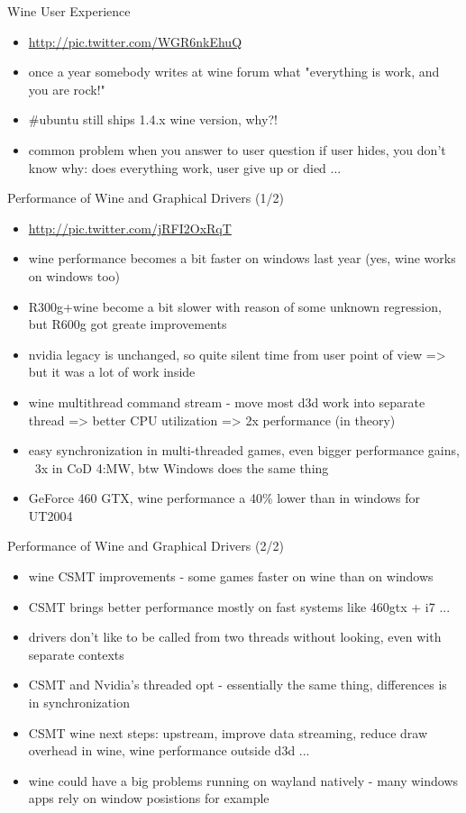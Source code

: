 \documentclass[aspectratio=169]{beamer}
\begin{document}
\begin{frame}{Wine User Experience}
  \begin{itemize}
  \item \url{http://pic.twitter.com/WGR6nkEhuQ}
  \item once a year somebody writes at wine forum what "everything is work, and you are rock!"
  \item \#ubuntu still ships 1.4.x wine version, why?!
  \item common problem when you answer to user question if user hides, you don't know why: does everything work, user give up or died ...
  \end{itemize}
\end{frame} 
 
\begin{frame}{Performance of Wine and Graphical Drivers (1/2)}
  \begin{itemize}
  \item \url{http://pic.twitter.com/jRFI2OxRqT}
  \item wine performance becomes a bit faster on windows last year (yes, wine works on windows too)
  \item R300g+wine become a bit slower with reason of some unknown regression, but R600g got greate improvements
  \item nvidia legacy is unchanged, so quite silent time from user point of view => but it was a lot of work inside
  \item wine multithread command stream - move most d3d work into separate thread => better CPU utilization => 2x performance (in theory)
  \item easy synchronization in multi-threaded games, even bigger performance gains, ~3x in CoD 4:MW, btw Windows does the same thing
  \item GeForce 460 GTX, wine performance a 40\% lower than in windows for UT2004
  \end{itemize}
\end{frame}  
  
\begin{frame}{Performance of Wine and Graphical Drivers (2/2)}
  \begin{itemize}
  \item wine CSMT improvements - some games faster on wine than on windows
  \item CSMT brings better performance mostly on fast systems like 460gtx + i7 ...
  \item drivers don't like to be called from two threads without looking, even with separate contexts
  \item CSMT and Nvidia's threaded opt - essentially the same thing, differences is in synchronization
  \item CSMT wine next steps: upstream, improve data streaming, reduce draw overhead in wine, wine performance outside d3d ...
  \item wine could have a big problems running on wayland natively - many windows apps rely on window posistions for example
  \end{itemize}
\end{frame}  
  
\end{document}
